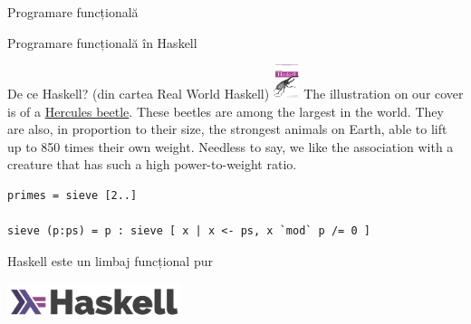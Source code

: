 \documentclass[xcolor=pdftex,romanian,colorlinks]{beamer}
\begin{document}
\begin{section}{Programare funcțională}
\begin{frame}[fragile]{Programare funcțională în Haskell}


\begin{block}{De ce Haskell? (din cartea Real World Haskell)
{\includegraphics[height=1cm]{rwh.jpg}}}
{The illustration on our cover is of a \href{https://en.wikipedia.org/wiki/Hercules_beetle}{Hercules beetle}. These beetles are among the largest in the world. They are also, in proportion to their size, the strongest animals on Earth, able to lift up to 850 times their own weight. Needless to say, we like the association with a creature that has such a high power-to-weight ratio.}
\end{block}

\pause
\begin{lstlisting}
primes = sieve [2..]

sieve (p:ps) = p : sieve [ x | x <- ps, x `mod` p /= 0 ]
\end{lstlisting}

\end{frame}


%
%
%

\begin{frame}{Haskell este un limbaj funcțional pur}
\begin{center}
\includegraphics[height=1cm]{lambda.png} 
\end{center}


\end{frame}
\end{section}
\end{document}

